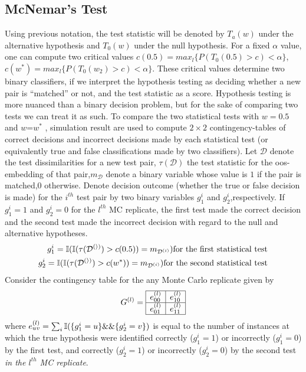 \documentclass[12pt,oneside,final]{thesis}
\begin{document}
\subsection{McNemar's Test\label{subsec:McNemarstest}}
Using previous notation,  the test statistic will be denoted by $T_a(w)$ under the alternative hypothesis and $T_0(w)$ under the null hypothesis.
For a fixed $\alpha$ value, one can compute two critical values $c(0.5)=max_l \{  P(T_0(0.5)>c)<\alpha\}$,  $c(w^*)=max_l \{  P(T_0(w_2)>c)<\alpha\}$. These critical values determine two binary classifiers, if we interpret the hypothesis testing as deciding whether a new pair is ``matched'' or not, and the test statistic as a score. Hypothesis testing is more nuanced than a binary decision problem, but for the sake of comparing two tests we can treat it as such.
To compare the  two statistical tests with  $w=0.5$ and $w$=$w^*$ , simulation result are used to compute $2\times 2$ contingency-tables of correct decisions and incorrect decisions made by each statistical test (or equivalently true and false classifications made by two classifiers). Let $\mathcal{D}$ denote the test dissimilarities for a new test pair, $\tau(\mathcal{D})$ the test statistic for the oos-embedding of that pair,$m_{\mathcal{D}}$ denote a binary variable whose value is $1$ if the pair is matched,$0$ otherwise. Denote decision outcome (whether the true or false decision is made) for the $i^{th}$ test pair by two binary variables $g_1^{i}$ and $g_2^{i}$,respectively.  If $g_1^{i} =1$ and $g_2^{i}=0$  for the $l^{th}$ MC replicate,  the first test made the correct decision and the second test made the incorrect decision with regard to the null and alternative hypotheses. 
\begin{align*}
g_1^{i}=\mathbb{I}(\mathbb{I}(\tau(\mathcal{D^{(i)}})>c(0.5))=m_{\mathcal{D}^{(i)}}) \textrm{for the first statistical test} \\
g_2^{i}=\mathbb{I}(\mathbb{I}(\tau(\mathcal{D^{(i)}})>c(w^*))=m_{\mathcal{D}^{(i)}}) \textrm{for the second statistical test}
\end{align*}
Consider the contingency table for the any Monte Carlo replicate given by $$G^{(l)}= \begin{array}{|c|c|}
      \hline
       e_{00}^{(l)} & e_{10}^{(l)}\\
      \hline
       e_{01}^{(l)} & e_{11}^{(l)}\\
      \hline
      \end{array}      $$  where  $e_{uv}^{(l)}=\sum_{i}{\mathbb{I}(\{g_1^{i}=u\} \&\& \{g_2^{i}=v\})}$ is equal to the number of instances at which the true hypothesis were identified  correctly ($g_1^{i}=1$) or incorrectly ($g_1^{i}=0$) by the first test, and correctly ($g_2^{i}=1$) or incorrectly ($g_2^{i}=0$) by the second test \emph{ in the $l^{th}$  MC replicate}.
\end{document}
